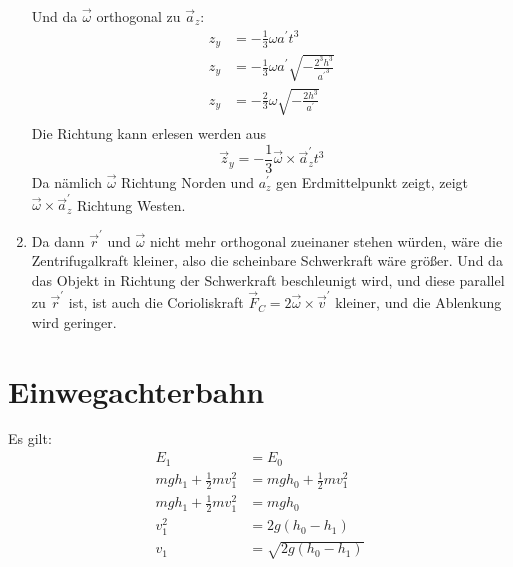\documentclass[sectionformat = aufgabe]{gadsescript}
\begin{document}
\begin{enumerate}[label=\alph*)]
		Und da $\vec \omega$ orthogonal zu $\vec a_z$:
		\begin{align*}
			z_y &= - \frac{1}{3}\omega a^\prime t^3\\
			z_y &= - \frac{1}{3} \omega a^\prime \sqrt{ -\frac{2^3h^3}{ {a^\prime}^3 } }\\
			z_y &= - \frac{2}{3} \omega \sqrt{ -\frac{2h^3}{ {a^\prime} } }\\
		\end{align*}
		Die Richtung kann erlesen werden aus
		\[ \vec z_y = -\frac{1}{3}\vec\omega\times\vec a_{z}^{\prime} t^3 \]
		Da nämlich $ \vec \omega $ Richtung Norden und $ a_z^\prime $ gen Erdmittelpunkt zeigt, zeigt $ \vec \omega \times \vec a_z^\prime $ Richtung Westen.
	\item Da dann $ \vec r^\prime $ und $ \vec \omega $ nicht mehr orthogonal zueinaner stehen würden, wäre die Zentrifugalkraft kleiner, also die scheinbare Schwerkraft wäre größer.
		Und da das Objekt in Richtung der Schwerkraft beschleunigt wird,
		und diese parallel zu $ \vec r^\prime $ ist,
		ist auch die Corioliskraft $ \vec F_C = 2 \vec \omega \times \vec v^\prime $ kleiner,
		und die Ablenkung wird geringer.
\end{enumerate}

\section{Einwegachterbahn}
Es gilt:
\begin{align*}
	E_1 &= E_0\\
	mgh_1 + \frac{1}{2} m v_1^2 &= mgh_0 + \frac{1}{2} m v_1^2\\
	mgh_1 + \frac{1}{2} m v_1^2 &= mgh_0\\
	v_1^2 &= 2g(h_0 - h_1)\\
	v_1 &= \sqrt{2g(h_0 - h_1)}\\
\end{align*}
\end{document}
